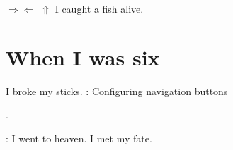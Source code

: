 {$\Rightarrow$}{$\Leftarrow$} 
{}{}{}{$\Uparrow$} 
I caught a fish alive. 
\section{When I was six} 
I broke my sticks. 
: Configuring navigation buttons 
{\addtocounter{head}{1}}{} 
{\par{}. }{} 
 {: }{}{} 
\tableofcontents[head] 
 I went to heaven. 
 I met my fate. 

